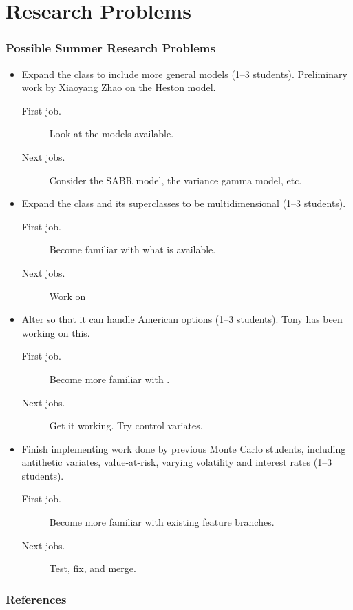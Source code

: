 \documentclass[10pt,compress,xcolor={usenames,dvipsnames}]{beamer} %
\begin{document}
\section{Research Problems}
\begin{frame}[allowframebreaks]
\frametitle{Possible Summer Research Problems}

\begin{itemize}

\item Expand the class  to include more general models (1--3 students).  Preliminary work by Xiaoyang Zhao on the Heston model.
\begin{description}
\item[First job.] Look at the models available.
\item[Next jobs.] Consider the SABR model, the variance gamma model, etc.
\end{description}

\item Expand the class  and its superclasses to be multidimensional 
(1--3 students).  
\begin{description}
\item[First job.] Become familiar with what is available.
\item[Next jobs.] Work on 
\end{description}

\item Alter  so that it can handle American options  (1--3 students).  Tony has been working on this.
\begin{description}
	\item[First job.] Become more familiar with .
	\item[Next jobs.] Get it working.  Try control variates.
\end{description}

\item Finish implementing work done by previous Monte Carlo students, including 
antithetic variates, value-at-risk, varying volatility and interest rates (1--3 students). 
\begin{description}
	\item[First job.] Become more familiar with existing feature branches.
	\item[Next jobs.] Test, fix, and merge.
\end{description}

\end{itemize}
\end{frame}


\begin{frame}\frametitle{References}

\end{frame}
\end{document}
